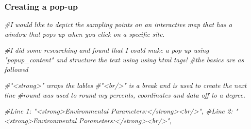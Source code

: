 \documentclass[
]{article}
\newenvironment{Shaded}{\begin{snugshade}}{\end{snugshade}}
\newcommand{\CommentTok}[1]{\textcolor[rgb]{0.56,0.35,0.01}{\textit{#1}}}
\begin{document}
\subsubsection{Creating a pop-up}\label{creating-a-pop-up}

\begin{Shaded}
\begin{Highlighting}[]
\CommentTok{\#I would like to depict the sampling points on an interactive map that has a window that pops up when you click on a specific site. }

\CommentTok{\#I did some researching and found that I could make a pop{-}up using "popup\_content" and structure the text using using html tags!}
\CommentTok{\#the basics are as followed }


\CommentTok{\#"\textless{}strong\textgreater{}" wraps the lables }
\CommentTok{\#"\textless{}br/\textgreater{}" is a break and is used to create the next line}
\CommentTok{\#round was used to round my percents, coordinates and data off to a degree.}



\CommentTok{\#Line 1: "\textless{}strong\textgreater{}Environmental Parameters:\textless{}/strong\textgreater{}\textless{}br/\textgreater{}",}
\CommentTok{\#Line 2: "\textless{}strong\textgreater{}Environmental Parameters:\textless{}/strong\textgreater{}\textless{}br/\textgreater{}",}



\end{Highlighting}
\end{Shaded}
\end{document}
